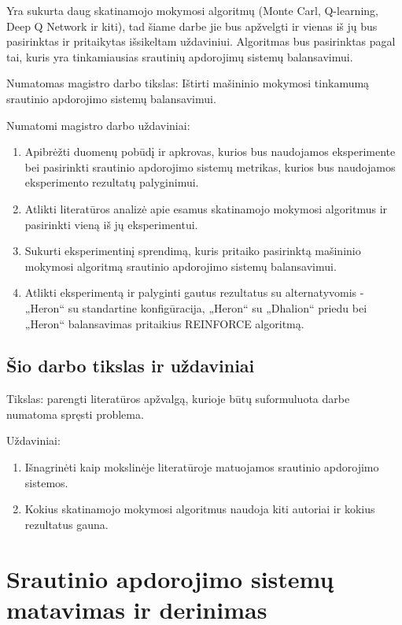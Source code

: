 \documentclass{VUMIFPSbakalaurinis}
\begin{document}
Yra sukurta daug skatinamojo mokymosi algoritmų (Monte Carl, Q-learning, Deep Q Network ir kiti), tad šiame darbe jie bus apžvelgti ir vienas iš jų bus pasirinktas ir pritaikytas išsikeltam uždaviniui. Algoritmas bus pasirinktas pagal tai, kuris yra tinkamiausias srautinių apdorojimų sistemų balansavimui.

Numatomas magistro darbo tikslas: Ištirti mašininio mokymosi tinkamumą srautinio apdorojimo sistemų balansavimui. 

Numatomi magistro darbo uždaviniai:
\begin{enumerate}
    \item Apibrėžti duomenų pobūdį ir apkrovas, kurios bus naudojamos eksperimente bei pasirinkti srautinio apdorojimo sistemų metrikas, kurios bus naudojamos eksperimento rezultatų palyginimui.
    \item Atlikti literatūros analizė apie esamus skatinamojo mokymosi algoritmus ir pasirinkti vieną iš jų eksperimentui. 
    \item Sukurti eksperimentinį sprendimą, kuris pritaiko pasirinktą mašininio mokymosi algoritmą srautinio apdorojimo sistemų balansavimui.
    \item Atlikti eksperimentą ir palyginti gautus rezultatus su alternatyvomis - „Heron“ su standartine konfigūracija, „Heron“ su „Dhalion“ priedu bei „Heron“ balansavimas pritaikius REINFORCE algoritmą. 
\end{enumerate}


\subsection{Šio darbo tikslas ir uždaviniai}
Tikslas: parengti literatūros apžvalgą, kurioje būtų suformuluota darbe numatoma spręsti problema.

Uždaviniai:
\begin{enumerate}
    \item Išnagrinėti kaip mokslinėje literatūroje matuojamos srautinio apdorojimo sistemos.
    \item Kokius skatinamojo mokymosi algoritmus naudoja kiti autoriai ir kokius rezultatus gauna. 
\end{enumerate}

\section{Srautinio apdorojimo sistemų matavimas ir derinimas}
\end{document}
